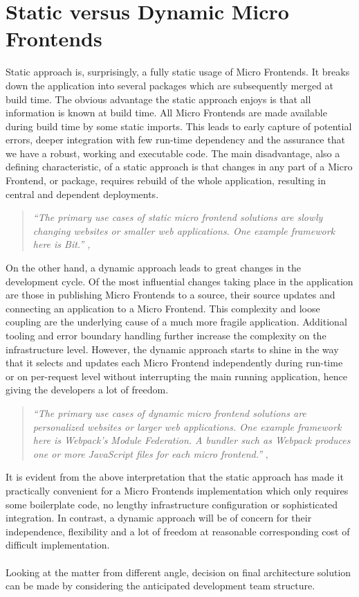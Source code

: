 \documentclass[a4paper]{book}
\begin{document}
\section{Static versus Dynamic Micro Frontends}
Static approach is, surprisingly, a fully static usage of Micro Frontends. It breaks down the application into several packages which are subsequently merged at build time. The obvious advantage the static approach enjoys is that all information is known at build time. All Micro Frontends are made available during build time by some static imports. This leads to early capture of potential errors, deeper integration with few run-time dependency and the assurance that we have a robust, working and executable code. The main disadvantage, also a defining characteristic, of a static approach is that changes in any part of a Micro Frontend, or package, requires rebuild of the whole application, resulting in central and dependent deployments. \cite{Rap20}
\begin{quote}
    \textit{“The primary use cases of static micro frontend solutions are slowly changing websites or smaller web applications. One example framework here is Bit.” \cite{Bit15}, \cite{Rap20}}
\end{quote}

On the other hand, a dynamic approach leads to great changes in the development cycle. Of the most influential changes taking place in the application are those in publishing Micro Frontends to a source, their source updates and connecting an application to a Micro Frontend. This complexity and loose coupling are the underlying cause of a much more fragile application. Additional tooling and error boundary handling further increase the complexity on the infrastructure level. However, the dynamic approach starts to shine in the way that it selects and updates each Micro Frontend independently during run-time or on per-request level without interrupting the main running application, hence giving the developers a lot of freedom. \cite{Rap20} 
\begin{quote}
\textit{“The primary use cases of dynamic micro frontend solutions are personalized websites or larger web applications. One example framework here is Webpack's Module Federation. A bundler such as Webpack produces one or more JavaScript files for each micro frontend.”} \cite{Webpack}, \cite{Rap20}
\end{quote}

It is evident from the above interpretation that the static approach has made it practically convenient for a Micro Frontends implementation which only requires some boilerplate code, no lengthy infrastructure configuration or sophisticated integration. In contrast, a dynamic approach will be of concern for their independence, flexibility and a lot of freedom at reasonable corresponding cost of difficult implementation. 
\\ \\
Looking at the matter from different angle, decision on final architecture solution can be made by considering the anticipated development team structure.
\end{document}
